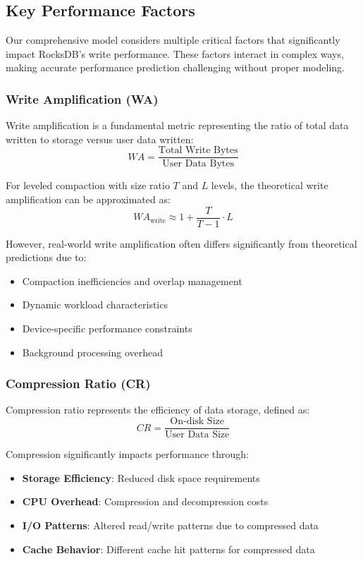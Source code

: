 \documentclass[11pt]{article}
\begin{document}
\subsection{Key Performance Factors}

Our comprehensive model considers multiple critical factors that significantly impact RocksDB's write performance. These factors interact in complex ways, making accurate performance prediction challenging without proper modeling.

\subsubsection{Write Amplification (WA)}
Write amplification is a fundamental metric representing the ratio of total data written to storage versus user data written:
\begin{equation}
WA = \frac{\text{Total Write Bytes}}{\text{User Data Bytes}}
\end{equation}

For leveled compaction with size ratio $T$ and $L$ levels, the theoretical write amplification can be approximated as:
\begin{equation}
WA_{\text{write}} \approx 1 + \frac{T}{T-1} \cdot L
\end{equation}

However, real-world write amplification often differs significantly from theoretical predictions due to:
\begin{itemize}
    \item Compaction inefficiencies and overlap management
    \item Dynamic workload characteristics
    \item Device-specific performance constraints
    \item Background processing overhead
\end{itemize}

\subsubsection{Compression Ratio (CR)}
Compression ratio represents the efficiency of data storage, defined as:
\begin{equation}
CR = \frac{\text{On-disk Size}}{\text{User Data Size}}
\end{equation}

Compression significantly impacts performance through:
\begin{itemize}
    \item \textbf{Storage Efficiency}: Reduced disk space requirements
    \item \textbf{CPU Overhead}: Compression and decompression costs
    \item \textbf{I/O Patterns}: Altered read/write patterns due to compressed data
    \item \textbf{Cache Behavior}: Different cache hit patterns for compressed data
\end{itemize}
\end{document}
